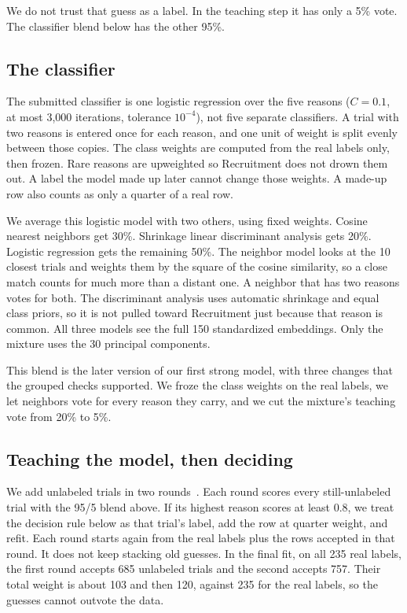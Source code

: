 We do not trust that guess as a label. In the teaching step it has only a 5\%
vote. The classifier blend below has the other 95\%.

\subsection{The classifier}

The submitted classifier is one logistic regression over the five reasons
($C = 0.1$, at most 3,000 iterations, tolerance $10^{-4}$), not five separate
classifiers. A trial with two reasons is entered once for each reason, and one
unit of weight is split evenly between those copies. The class weights are
computed from the real labels only, then frozen. Rare reasons are upweighted so
Recruitment does not drown them out. A label the model made up later cannot
change those weights. A made-up row also counts as only a quarter of a real row.

We average this logistic model with two others, using fixed weights. Cosine
nearest neighbors get 30\%. Shrinkage linear discriminant analysis gets 20\%.
Logistic regression gets the remaining 50\%. The neighbor model looks at the 10
closest trials and weights them by the square of the cosine similarity, so a
close match counts for much more than a distant one. A neighbor that has two
reasons votes for both. The discriminant analysis uses automatic shrinkage and
equal class priors, so it is not pulled toward Recruitment just because that
reason is common. All three models see the full 150 standardized embeddings.
Only the mixture uses the 30 principal components.

This blend is the later version of our first strong model, with three changes
that the grouped checks supported. We froze the class weights on the real
labels, we let neighbors vote for every reason they carry, and we cut the
mixture's teaching vote from 20\% to 5\%.

\subsection{Teaching the model, then deciding}

We add unlabeled trials in two rounds~\cite{yarowsky1995unsupervised,triguero2015selflabeled}.
Each round scores every still-unlabeled trial with the 95/5 blend above. If its
highest reason scores at least 0.8, we treat the decision rule below as that
trial's label, add the row at quarter weight, and refit. Each round starts again
from the real labels plus the rows accepted in that round. It does not keep
stacking old guesses. In the final fit, on all 235 real labels, the first round
accepts 685 unlabeled trials and the second accepts 757. Their total weight is
about 103 and then 120, against 235 for the real labels, so the guesses cannot
outvote the data.

